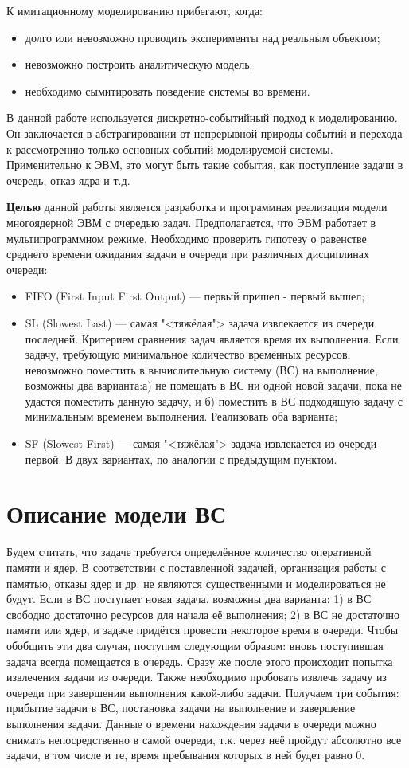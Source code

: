 \documentclass[russian, 14pt, a4paper]{extreport}
\begin{document}
К имитационному моделированию прибегают, когда:
\begin{itemize}
\item долго или невозможно проводить эксперименты над реальным объектом;
\item невозможно построить аналитическую модель;
\item необходимо сымитировать поведение системы во времени.
\end{itemize}

В данной работе используется дискретно-событийный подход к моделированию. Он заключается в абстрагировании от непрерывной природы событий и перехода к рассмотрению только основных событий моделируемой системы. Применительно к ЭВМ, это могут быть такие события, как поступление задачи в очередь, отказ ядра и т.д.

\textbf{Целью} данной работы является разработка и программная реализация модели многоядерной ЭВМ с очередью задач. Предполагается, что ЭВМ работает в мультипрограммном режиме. Необходимо проверить гипотезу о равенстве среднего времени ожидания задачи в очереди при различных дисциплинах очереди: 
\begin{itemize}
\item FIFO (First Input First Output) --- первый пришел - первый вышел;
\item SL (Slowest Last) --- самая "<тяжёлая"> задача извлекается из очереди последней. Критерием сравнения задач является время их выполнения. Если задачу, требующую минимальное количество временных ресурсов, невозможно поместить в вычислительную систему (ВС) на выполнение, возможны два варианта:а) не помещать в ВС ни одной новой задачи, пока не удастся поместить данную задачу, и б) поместить в ВС подходящую задачу с минимальным временем выполнения. Реализовать оба варианта;
\item SF (Slowest First) --- самая "<тяжёлая"> задача извлекается из очереди первой. В двух вариантах, по аналогии с предыдущим пунктом.

\end{itemize}
\chapter{Описание модели ВС}
Будем считать, что задаче требуется определённое количество оперативной памяти и ядер. В соответствии с поставленной задачей, организация работы с памятью, отказы ядер и др. не являются существенными и моделироваться не будут. Если в ВС поступает новая задача, возможны два варианта: 1) в ВС свободно достаточно ресурсов для начала её выполнения; 2) в ВС не достаточно памяти или ядер, и задаче придётся провести некоторое время в очереди. Чтобы обобщить эти два случая, поступим следующим образом: вновь поступившая задача всегда помещается в очередь. Сразу же после этого происходит попытка извлечения задачи из очереди. Также необходимо пробовать извлечь задачу из очереди при завершении выполнения какой-либо задачи. Получаем три события: прибытие задачи в ВС, постановка задачи на выполнение и завершение выполнения задачи. Данные о времени нахождения задачи в очереди можно снимать непосредственно в самой очереди, т.к. через неё пройдут абсолютно все задачи, в том числе и те, время пребывания которых в ней будет равно 0.
\end{document}
